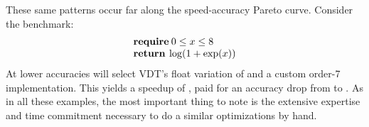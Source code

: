 \documentclass[paper.tex]{subfiles}
\begin{document}
These same patterns occur far along the speed-accuracy Pareto curve.
Consider the  benchmark:
\[
\begin{array}{l}
\text{\textbf{require}}\:0 \le x \le 8 \\
\text{\textbf{return}}\: \log(1 + \exp (x))
\end{array}
\]
At lower accuracies \name will select
  VDT's float variation of 
  and a custom order-7  implementation.
This yields a speedup of \nDetailedThreeSpeedup,
  paid for an accuracy drop from \nDetailedThreeErrorGlibc to \nDetailedThreeErrorChosen.
As in all these examples, the most important thing to note
  is the extensive expertise and time commitment necessary
  to do a similar optimizations by hand.


\end{document}
